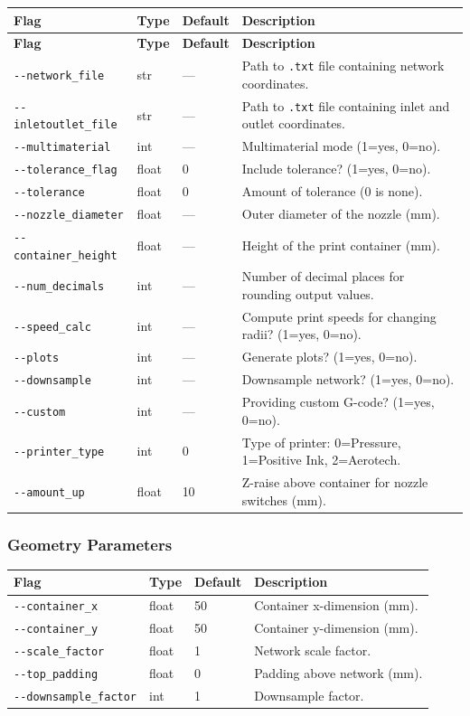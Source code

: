\documentclass[11pt,letterpaper]{article}
\newcommand{\code}[1]{\texttt{#1}}
\begin{document}
\begin{longtable}{L{3.8cm} l l L{5.5cm}}
\toprule
\textbf{Flag} & \textbf{Type} & \textbf{Default} & \textbf{Description} \\
\midrule
\endfirsthead
\toprule
\textbf{Flag} & \textbf{Type} & \textbf{Default} & \textbf{Description} \\
\midrule
\endhead
\code{-{}-network\_file} & str & --- & Path to \code{.txt} file containing network coordinates. \\
\code{-{}-inletoutlet\_file} & str & --- & Path to \code{.txt} file containing inlet and outlet coordinates. \\
\code{-{}-multimaterial} & int & --- & Multimaterial mode (1=yes, 0=no). \\
\code{-{}-tolerance\_flag} & float & 0 & Include tolerance? (1=yes, 0=no). \\
\code{-{}-tolerance} & float & 0 & Amount of tolerance (0 is none). \\
\code{-{}-nozzle\_diameter} & float & --- & Outer diameter of the nozzle (mm). \\
\code{-{}-container\_height} & float & --- & Height of the print container (mm). \\
\code{-{}-num\_decimals} & int & --- & Number of decimal places for rounding output values. \\
\code{-{}-speed\_calc} & int & --- & Compute print speeds for changing radii? (1=yes, 0=no). \\
\code{-{}-plots} & int & --- & Generate plots? (1=yes, 0=no). \\
\code{-{}-downsample} & int & --- & Downsample network? (1=yes, 0=no). \\
\code{-{}-custom} & int & --- & Providing custom G-code? (1=yes, 0=no). \\
\code{-{}-printer\_type} & int & 0 & Type of printer: 0=Pressure, 1=Positive Ink, 2=Aerotech. \\
\code{-{}-amount\_up} & float & 10 & Z-raise above container for nozzle switches (mm). \\
\bottomrule
\end{longtable}

\subsubsection{Geometry Parameters}

\begin{tabularx}{\textwidth}{L{3.8cm} l l X}
\toprule
\textbf{Flag} & \textbf{Type} & \textbf{Default} & \textbf{Description} \\
\midrule
\code{-{}-container\_x} & float & 50 & Container x-dimension (mm). \\
\code{-{}-container\_y} & float & 50 & Container y-dimension (mm). \\
\code{-{}-scale\_factor} & float & 1 & Network scale factor. \\
\code{-{}-top\_padding} & float & 0 & Padding above network (mm). \\
\code{-{}-downsample\_factor} & int & 1 & Downsample factor. \\
\bottomrule
\end{tabularx}
\end{document}
